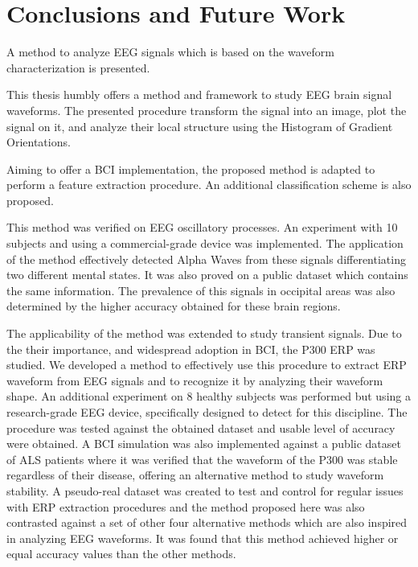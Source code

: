 \chapter{Conclusions and Future Work}
\label{chapter:seven}

A method to analyze EEG signals which is based on the waveform characterization is presented. 

This thesis humbly offers a method and framework to study EEG brain signal waveforms.  The presented procedure transform the signal into an image, plot the signal on it, and analyze their local structure using the Histogram of Gradient Orientations.

Aiming to offer a BCI implementation, the proposed method is adapted to perform a feature extraction procedure.  An additional classification scheme is also proposed.

This method was verified on EEG oscillatory processes.  An experiment with 10 subjects and using a commercial-grade device was implemented.  The application of the method effectively detected Alpha Waves from these signals differentiating two different mental states.  It was also proved on a public dataset which contains the same information.  The prevalence of this signals in occipital areas was also determined by the higher accuracy obtained for these brain regions.

The applicability of the method was extended to study transient signals.  Due to the their importance, and widespread adoption in BCI, the P300 ERP was studied.  We developed a method to effectively use this procedure to extract ERP waveform from EEG signals and to recognize it by analyzing their waveform shape.  An additional experiment on 8 healthy subjects was performed but using a research-grade EEG device, specifically designed to detect for this discipline.  The procedure was tested against the obtained dataset and usable level of accuracy were obtained.  A BCI simulation was also implemented against a public dataset of ALS patients where it was verified that the waveform of the P300 was stable regardless of their disease, offering an alternative method to study waveform stability.  A pseudo-real dataset was created to test and control for regular issues with ERP extraction procedures and the method proposed here was also contrasted against a set of other four alternative methods which are also inspired in analyzing EEG waveforms.  It was found that this method achieved higher or equal accuracy values than the other methods.

